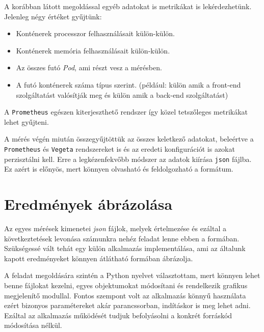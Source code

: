 

A korábban látott megoldással egyéb adatokat is metrikákat is lekérdezhetünk. Jelenleg négy értéket gyűjtünk:
\begin{itemize}
  \item Konténerek processzor felhasználásait külön-külön.
  \item Konténerek memória felhasználásait külön-külön.
  \item Az összes futó \textit{Pod}, ami részt vesz a mérésben.
  \item A futó konténerek száma típus szerint. (például: külön amik a front-end szolgáltatást valósítják meg és külön amik a back-end szolgáltatást)
\end{itemize}

A \verb+Prometheus+ egészen kiterjeszthető rendszer így közel tetszőleges metrikákat lehet gyűjteni. 


A mérés végén miután összegyűjtöttük az összes keletkező adatokat, beleértve a \verb+Prometheus+ és \verb+Vegeta+ rendszereket is és az eredeti konfigurációt is azokat perzisztálni kell. Erre a legkézenfekvőbb módszer az adatok kiírása \verb+json+ fájlba. Ez azért is előnyös, mert könnyen olvasható és feldolgozható a formátum. 

\section{Eredmények ábrázolása}
Az egyes mérések kimenetei \textit{json} fájlok, melyek értelmezése és ezáltal a következtetések levonása számunkra nehéz feladat lenne ebben a formában. 
Szükségessé vált tehát egy külön alkalmazás implementálása, ami az általunk kapott eredményeket könnyen átlátható formában ábrázolja. 

A feladat megoldására szintén a Python nyelvet választottam, mert könnyen lehet benne fájlokat kezelni, egyes objektumokat módosítani és rendelkezik grafikus megjelenítő modullal.
Fontos szempont volt az alkalmazás könnyű használata ezért bizonyos paramétereket akár parancssorban, indításkor is meg lehet adni. 
Ezáltal az alkalmazás működését tudjuk befolyásolni a konkrét forráskód módosítása nélkül.

